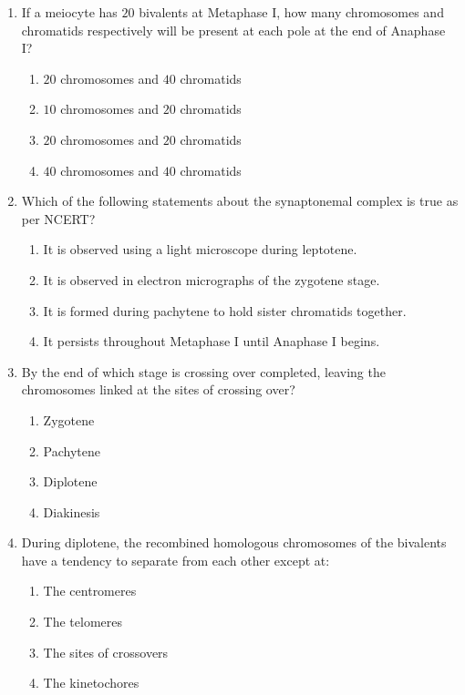 \documentclass[11pt,a4paper]{article}
\begin{document}
\begin{enumerate}[label=\textbf{\arabic*.}]
\item If a meiocyte has $20$ bivalents at Metaphase I, how many chromosomes and chromatids respectively will be present at each pole at the end of Anaphase I?
\begin{enumerate}[label=(\Alph*)]
    \item $20$ chromosomes and $40$ chromatids
    \item $10$ chromosomes and $20$ chromatids
    \item $20$ chromosomes and $20$ chromatids
    \item $40$ chromosomes and $40$ chromatids
\end{enumerate}

\item Which of the following statements about the synaptonemal complex is true as per NCERT?
\begin{enumerate}[label=(\Alph*)]
    \item It is observed using a light microscope during leptotene.
    \item It is observed in electron micrographs of the zygotene stage.
    \item It is formed during pachytene to hold sister chromatids together.
    \item It persists throughout Metaphase I until Anaphase I begins.
\end{enumerate}

\item By the end of which stage is crossing over completed, leaving the chromosomes linked at the sites of crossing over?
\begin{enumerate}[label=(\Alph*)]
    \item Zygotene
    \item Pachytene
    \item Diplotene
    \item Diakinesis
\end{enumerate}

\item During diplotene, the recombined homologous chromosomes of the bivalents have a tendency to separate from each other except at:
\begin{enumerate}[label=(\Alph*)]
    \item The centromeres
    \item The telomeres
    \item The sites of crossovers
    \item The kinetochores
\end{enumerate}


\end{enumerate}
\end{document}
